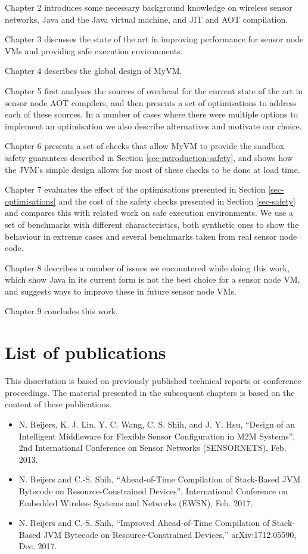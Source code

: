 Chapter 2 introduces some necessary background knowledge on wireless sensor networks, Java and the Java virtual machine, and JIT and AOT compilation.

Chapter 3 discusses the state of the art in improving performance for sensor node VMs and providing safe execution environments.

Chapter 4 describes the global design of MyVM.

Chapter 5 first analyses the sources of overhead for the current state of the art in sensor node AOT compilers, and then presents a set of optimisations to address each of these sources. In a number of cases where there were multiple options to implement an optimisation we also describe alternatives and motivate our choice.

Chapter 6 presents a set of checks that allow MyVM to provide the sandbox safety guarantees described in Section \ref{sec-introduction-safety}, and shows how the JVM's simple design allows for most of these checks to be done at load time.

Chapter 7 evaluates the effect of the optimisations presented in Section \ref{sec-optimisations} and the cost of the safety checks presented in Section \ref{sec-safety} and compares this with related work on safe execution environments. We use a set of benchmarks with different characteristics, both synthetic ones to show the behaviour in extreme cases and several benchmarks taken from real sensor node code.

Chapter 8 describes a number of issues we encountered while doing this work, which show Java in its current form is not the best choice for a sensor node VM, and suggests ways to improve these in future sensor node VMs.

Chapter 9 concludes this work.

\section{List of publications}
This dissertation is based on previously published technical reports or conference proceedings. The material presented in the subsequent chapters is based on the content of these publications.

\begin{itemize}
	\item N. Reijers, K. J. Lin, Y. C. Wang, C. S. Shih, and J. Y. Hsu, “Design of an Intelligent Middleware for Flexible Sensor Configuration in M2M Systems”, 2nd International Conference on Sensor Networks (SENSORNETS), Feb. 2013.
	\item N. Reijers and C.-S. Shih, “Ahead-of-Time Compilation of Stack-Based JVM Bytecode on Resource-Constrained Devices”, International Conference on Embedded Wireless Systems and Networks (EWSN), Feb. 2017.
	\item N. Reijers and C.-S. Shih, “Improved Ahead-of-Time Compilation of Stack-Based JVM Bytecode on Resource-Constrained Devices,” arXiv:1712.05590, Dec. 2017.
\end{itemize}

